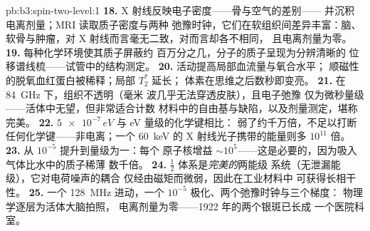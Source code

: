 \begin{solution}{pb:b3:spin-two-level:1}
\textbf{18.} X 射线反映电子密度——骨与空气的差别——
并沉积电离剂量；MRI 读取质子密度与两种
弛豫时钟，它们在软组织间差异丰富：脑、
软骨与肿瘤，对 X 射线而言毫无二致，对而言却各不相同，
且电离剂量为零。
\textbf{19.} 每种化学环境使其质子屏蔽约
百万分之几，分子的质子呈现为分辨清晰的
位移谱线梳——试管中的结构测定。
\textbf{20.} 活动提高局部血流量与氧合水平；
顺磁性的脱氧血红蛋白被稀释；局部 $T_2^*$ 延长；
体素在思维之后数秒即变亮。
\textbf{21.} 在 \qty{84}{GHz} 下，组织不透明（毫米
波几乎无法穿透皮肤），且电子弛豫
仅为微秒量级——活体中无望，但非常适合计数
材料中的自由基与缺陷，以及剂量测定，堪称完美。
\textbf{22.} $\num{5e-7}\,\unit{eV}$ 与 eV 量级的化学键相比：
弱了约千万倍，不足以打断任何化学键——非电离；一个
\qty{60}{keV} 的 X 射线光子携带的能量则多 $10^{11}$ 倍。
\textbf{23.} 从 $10^{-5}$ 提升到量级为一：每个
原子核增益 $\sim10^5$——这是必要的，因为吸入气体比水中的质子稀薄
数千倍。
\textbf{24.}  $\tfrac12$ 体系是\emph{完美的}两能级
系统（无泄漏能级），它对电荷噪声的耦合
仅经由磁矩而微弱，因此在工业材料中
可获得长相干性。
\textbf{25.} 一个 \qty{128}{MHz} 进动，一个 $10^{-5}$
极化、两个弛豫时钟与三个梯度：
物理学逐层为活体大脑拍照，
电离剂量为零——1922 年的两个银斑已长成
一个医院科室。
\end{solution}
